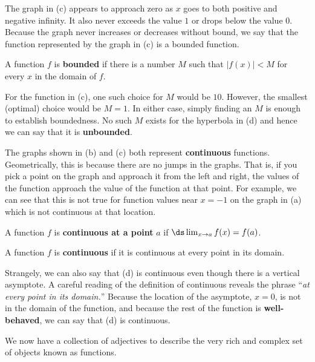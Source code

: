  The graph in (c) appears to approach zero as $x$ goes
to both positive and negative infinity.  It also never exceeds the value
$1$ or drops below the value $0$.  Because the graph never increases or
decreases without bound, we say that the function represented by the graph
in (c) is a {\dfont bounded} 
function.  

\begin{definition}
A function $f$ is \textbf{bounded} if there is a number $M$ such that
$|f(x)| < M$ for every $x$ in the domain of $f$.
\end{definition}

For the function in (c), one such choice for $M$ would be $10$.  However,
the smallest (optimal) choice would be $M=1$.  In either case, simply
finding an $M$ is enough to establish boundedness.  No such $M$ exists for
the hyperbola in (d) and hence we can say that it is 
\textbf{unbounded}.  

  The graphs shown in (b) and (c) both represent
{\bf continuous} functions.  Geometrically, this is because there are no
jumps in the graphs.  That is, if you pick a point on the graph and
approach it from the left and right, the values of the function approach
the value of the function at that point.  For example, we can see that this
is not true for function values near $x=-1$ on the graph in (a) which is
not continuous at that location.  

\begin{definition} A function $f$ is \textbf{continuous
at a point} $a$ if $\ds \lim_{x\to a} f(x) = f(a)$.  
\end{definition}

\begin{definition} A function $f$ is \textbf{continuous} if it is
continuous at every point in its domain.
\end{definition}

Strangely, we can also say that (d) is continuous even though there is a
vertical asymptote.  A careful reading of the definition of continuous
reveals the phrase ``\textit{at every point in its domain.}''  Because the
location of the asymptote, $x=0$, is not in the domain of the function, and
because the rest of the function is \textbf{well-behaved}, we can say that (d)
is continuous.

We now have a collection of adjectives to describe the very rich and
complex set of objects known as functions.

